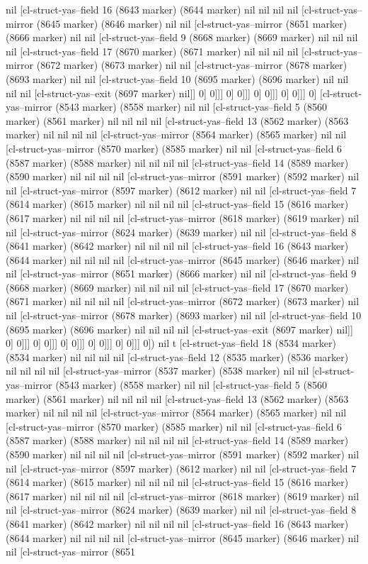 {{nil [cl-struct-yas--field 16 (8643 marker) (8644 marker) nil nil nil nil [cl-struct-yas--mirror (8645 marker) (8646 marker) nil nil [cl-struct-yas--mirror (8651 marker) (8666 marker) nil nil [cl-struct-yas--field 9 (8668 marker) (8669 marker) nil nil nil nil [cl-struct-yas--field 17 (8670 marker) (8671 marker) nil nil nil nil [cl-struct-yas--mirror (8672 marker) (8673 marker) nil nil [cl-struct-yas--mirror (8678 marker) (8693 marker) nil nil [cl-struct-yas--field 10 (8695 marker) (8696 marker) nil nil nil nil [cl-struct-yas--exit (8697 marker) nil]] 0] 0]]] 0] 0]]] 0] 0]]] 0] 0]]] 0] [cl-struct-yas--mirror (8543 marker) (8558 marker) nil nil [cl-struct-yas--field 5 (8560 marker) (8561 marker) nil nil nil nil [cl-struct-yas--field 13 (8562 marker) (8563 marker) nil nil nil nil [cl-struct-yas--mirror (8564 marker) (8565 marker) nil nil [cl-struct-yas--mirror (8570 marker) (8585 marker) nil nil [cl-struct-yas--field 6 (8587 marker) (8588 marker) nil nil nil nil [cl-struct-yas--field 14 (8589 marker) (8590 marker) nil nil nil nil [cl-struct-yas--mirror (8591 marker) (8592 marker) nil nil [cl-struct-yas--mirror (8597 marker) (8612 marker) nil nil [cl-struct-yas--field 7 (8614 marker) (8615 marker) nil nil nil nil [cl-struct-yas--field 15 (8616 marker) (8617 marker) nil nil nil nil [cl-struct-yas--mirror (8618 marker) (8619 marker) nil nil [cl-struct-yas--mirror (8624 marker) (8639 marker) nil nil [cl-struct-yas--field 8 (8641 marker) (8642 marker) nil nil nil nil [cl-struct-yas--field 16 (8643 marker) (8644 marker) nil nil nil nil [cl-struct-yas--mirror (8645 marker) (8646 marker) nil nil [cl-struct-yas--mirror (8651 marker) (8666 marker) nil nil [cl-struct-yas--field 9 (8668 marker) (8669 marker) nil nil nil nil [cl-struct-yas--field 17 (8670 marker) (8671 marker) nil nil nil nil [cl-struct-yas--mirror (8672 marker) (8673 marker) nil nil [cl-struct-yas--mirror (8678 marker) (8693 marker) nil nil [cl-struct-yas--field 10 (8695 marker) (8696 marker) nil nil nil nil [cl-struct-yas--exit (8697 marker) nil]] 0] 0]]] 0] 0]]] 0] 0]]] 0] 0]]] 0] 0]]] 0]) nil t [cl-struct-yas--field 18 (8534 marker) (8534 marker) nil nil nil nil [cl-struct-yas--field 12 (8535 marker) (8536 marker) nil nil nil nil [cl-struct-yas--mirror (8537 marker) (8538 marker) nil nil [cl-struct-yas--mirror (8543 marker) (8558 marker) nil nil [cl-struct-yas--field 5 (8560 marker) (8561 marker) nil nil nil nil [cl-struct-yas--field 13 (8562 marker) (8563 marker) nil nil nil nil [cl-struct-yas--mirror (8564 marker) (8565 marker) nil nil [cl-struct-yas--mirror (8570 marker) (8585 marker) nil nil [cl-struct-yas--field 6 (8587 marker) (8588 marker) nil nil nil nil [cl-struct-yas--field 14 (8589 marker) (8590 marker) nil nil nil nil [cl-struct-yas--mirror (8591 marker) (8592 marker) nil nil [cl-struct-yas--mirror (8597 marker) (8612 marker) nil nil [cl-struct-yas--field 7 (8614 marker) (8615 marker) nil nil nil nil [cl-struct-yas--field 15 (8616 marker) (8617 marker) nil nil nil nil [cl-struct-yas--mirror (8618 marker) (8619 marker) nil nil [cl-struct-yas--mirror (8624 marker) (8639 marker) nil nil [cl-struct-yas--field 8 (8641 marker) (8642 marker) nil nil nil nil [cl-struct-yas--field 16 (8643 marker) (8644 marker) nil nil nil nil [cl-struct-yas--mirror (8645 marker) (8646 marker) nil nil [cl-struct-yas--mirror (8651 }}
